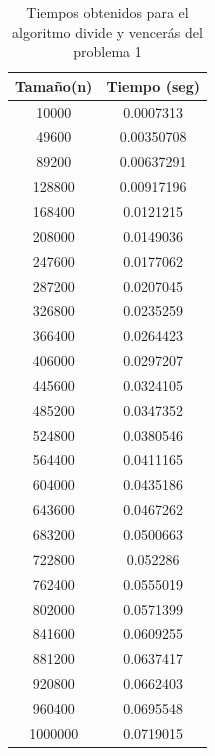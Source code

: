 \documentclass{article}
\begin{document}
\begin{table}[]
    \centering
    \begin{tabular}{|c|c|}
            \hline
        Tamaño(n) & Tiempo (seg) \\
        \hline
         10000   &   0.0007313 \\
        49600    &  0.00350708\\
        89200     & 0.00637291\\
        128800     &0.00917196\\
        168400&     0.0121215\\
        208000 &    0.0149036\\
        247600  &   0.0177062\\
        287200   &  0.0207045\\
        326800    & 0.0235259\\
        366400     &0.0264423\\
        406000&     0.0297207\\
        445600 &    0.0324105\\
        485200  &   0.0347352\\
        524800   &  0.0380546\\
        564400    & 0.0411165\\
        604000     &0.0435186\\
        643600&     0.0467262\\
        683200 &    0.0500663\\
        722800  &   0.052286\\
        762400   &  0.0555019\\
        802000    & 0.0571399\\
        841600     &0.0609255\\
        881200&     0.0637417\\
        920800 &    0.0662403\\
        960400  &   0.0695548\\
        1000000  &  0.0719015\\
        \hline
    \end{tabular}
    \caption{\centering Tiempos obtenidos para el algoritmo divide y vencerás del problema 1}
    \label{tab:time_p1_dyv}
\end{table}
\end{document}
